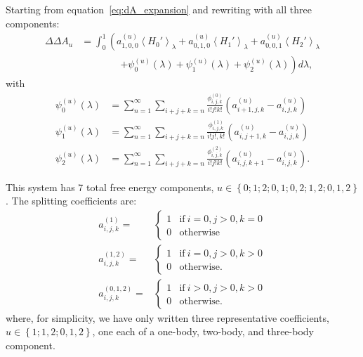 \documentclass{article}
\begin{document}
\begin{appendices}
 Starting from equation~\ref{eq:dA_expansion} and rewriting with all three components: 
\begin{align}
\Delta\Delta A_u &=
	\int_0^1 \left(
	a_{1,0,0}^{(u)}\left\langle H_0' \right\rangle_{\lambda} +
        a_{0,1,0}^{(u)}\left\langle H_1' \right\rangle_{\lambda} +
        a_{0,0,1}^{(u)}\left\langle H_2' \right\rangle_{\lambda} 
\right. \nonumber \\ & \qquad \qquad \left. + 
        \psi_0^{(u)}(\lambda) +
        \psi_1^{(u)}(\lambda) +
        \psi_2^{(u)}(\lambda)
    \right) d\lambda,
\label{eq3:dA_expansion}
\end{align}
with
\begin{align}
\psi_0^{(u)}(\lambda) &=
	\sum_{n=1}^{\infty}
    \sum_{i+j+k=n}
        \frac{\phi_{i,j,k}^{(0)}}{i!j!k!}
        \left(
            {a_{i+1,j,k}^{(u)}} -
            {a_{i,j,k}^{(u)}}
        \right) \label{eq3:psi0}\\
\psi_1^{(u)}(\lambda) &=
	\sum_{n=1}^{\infty}
    \sum_{i+j+k=n}
        \frac{\phi_{i,j,k}^{(1)}}{i!j!,k!}
        \left(
            {a_{i,j+1,k}^{(u)}} -
            {a_{i,j,k}^{(u)}}
        \right) \label{eq3:psi1}\\
\psi_2^{(u)}(\lambda) &=
	\sum_{n=1}^{\infty}
    \sum_{i+j+k=n}
        \frac{\phi_{i,j,k}^{(2)}}{i!j!k!}
        \left(
            a_{i,j,k+1}^{(u)} -
            a_{i,j,k}^{(u)}
      	\right)\label{eq3:psi2}.
\end{align}

This system has 7 total free energy components, $u \in \left\{ 0;1;2;0,1;0,2;1,2;0,1,2\right\}$. The splitting coefficients are: 
\begin{align}
a_{i,j,k}^{(1)} =&
	\begin{cases}
	1 &\text{if}\ i=0,  j>0,k=0 \\
	0 &\text{otherwise}
	\end{cases} \nonumber \\
a_{i,j,k}^{(1,2)} =&
	\begin{cases}
	1 &\text{if}\ i=0,  j>0,k>0 \\
	0 &\text{otherwise}.
	\end{cases} \nonumber \\ 
a_{i,j,k}^{(0,1,2)} =&
	\begin{cases}
	1 &\text{if}\ i>0,  j>0,k >0 \\
	0 &\text{otherwise}.
	\end{cases} 
\label{eq3:splitCoeffsGood}
\end{align}
where, for simplicity, we have only written three representative coefficients, $u \in \left\{ 1;1,2;0,1,2 \right\}$, one each of a one-body, two-body, and three-body component. 



\end{appendices}
\end{document}

